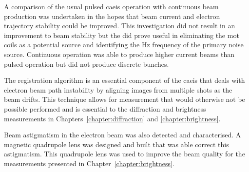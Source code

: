 A comparison of the usual pulsed \gls{caeis} operation with continuous beam production was undertaken in the hopes that beam current and electron trajectory stability could be improved.
This investigation did not result in an improvement to beam stability but the did prove useful in eliminating the \gls{mot} coils as a potential source and identifying the \unit[50]{Hz} frequency of the primary  noise source.
Continuous operation was able to produce  higher current beams than pulsed operation but did not produce discrete bunches.

The registration algorithm is an essential component of the \gls{caeis} that deals with electron beam path instability by aligning images from multiple shots as the beam drifts.
This technique allows for measurement that would otherwise not be possible performed and is essential to the diffraction and brightness measurements in Chapters~\ref{chapter:diffraction} and \ref{chapter:brightness}.

Beam astigmatism in the electron beam was also detected and characterised.
A magnetic quadrupole lens was designed and built that was able correct this astigmatism.
This quadrupole lens was used to improve the beam quality for the measurements presented in Chapter~\ref{chapter:brightness}.